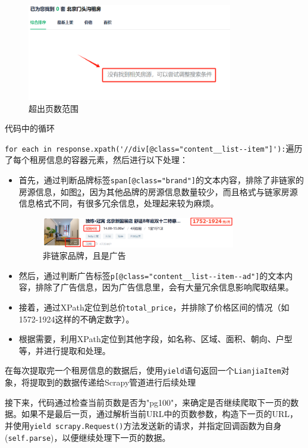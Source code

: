 \documentclass[lang=cn,11pt,a4paper]{elegantpaper}
\begin{document}
\begin{enumerate}
\begin{figure}[htbp]
    \centering
    \includegraphics[width=0.8\textwidth, height=0.17\textheight]{image/empty_page.png}
    \caption{超出页数范围}
    \label{fig:emptyPage}
\end{figure}

代码中的循环

\lstinline{for each in response.xpath('//div[@class="content__list--item"]'):}遍历了每个租房信息的容器元素，然后进行以下处理：
\begin{itemize}
    \item 首先，通过判断品牌标签\lstinline{span[@class="brand"]}的文本内容，排除了非链家的房源信息，如图\ref{fig:ad}，因为其他品牌的房源信息数量较少，而且格式与链家房源信息格式不同，有很多冗余信息，处理起来较为麻烦。
    \begin{figure}[htbp]
        \centering
        \includegraphics[width=0.8\textwidth]{image/ad.png}
        \caption{非链家品牌，且是广告}
        \label{fig:ad}
    \end{figure}
    \item 然后，通过判断广告标签\lstinline{p[@class="content__list--item--ad"]}的文本内容，排除了广告信息，因为广告信息里，会有大量冗余信息影响爬取结果。
    \item 接着，通过XPath定位到总价\lstinline{total_price}，并排除了价格区间的情况（如1572-1924这样的不确定数字）。
    \item 根据需要，利用XPath定位到其他字段，如名称、区域、面积、朝向、户型等，并进行提取和处理。
\end{itemize}


在每次提取完一个租房信息的数据后，使用\lstinline{yield}语句返回一个\lstinline{LianjiaItem}对象，将提取到的数据传递给Scrapy管道进行后续处理

接下来，代码通过检查当前页数是否为"pg100"，来确定是否继续爬取下一页的数据。如果不是最后一页，通过解析当前URL中的页数参数，构造下一页的URL，并使用\lstinline{yield scrapy.Request()}方法发送新的请求，并指定回调函数为自身(\lstinline{self.parse})，以便继续处理下一页的数据。


\end{enumerate}
\end{document}

